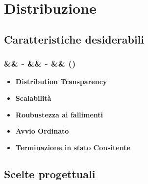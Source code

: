 \documentclass[slidestop,compress,blackandwhite]{beamer}
\newcommand{\itemB}[3]{
	\item \textbf{#1} #2 \vspace{#3}
}
\newcommand{\ii}[1]{\textit{#1}}
\newcommand{\newtitle}[4]{
	#1 
	\ifx&#2&%
	\else
  		\large- #2
	\fi
	\ifx&#3&%
	\else
  		\normalsize- #3
	\fi
	\ifx&#4&%
	\else
  		\normalsize (#4)
	\fi
}
\newcommand{\newframe}[5]{
	\begin{frame}
		\frametitle{\newtitle{#1}{#2}{#3}{#4}}
		#5
	\end{frame}
}
\begin{document}
\section{Distribuzione}\label{distr}

	\subsection{Caratteristiche desiderabili}\label{characteristics}
	\newframe{}{}{}{}{
		\vspace{0.5cm}
		\begin{itemize}
			\itemB{Distribution Transparency}{}{0.6cm}
			\itemB{Scalabilità}{}{0.6cm} 
			\itemB{Roubustezza ai fallimenti}{}{0.6cm} 
			\itemB{Avvio Ordinato}{}{0.6cm} 
			\itemB{Terminazione in stato Consitente}{}{0.6cm}
		\end{itemize}
	}
	
		
%		
%		
%	
%	

%	
%	
%	
	
	\subsection{Scelte progettuali}\label{scelte}
	
\end{document}
